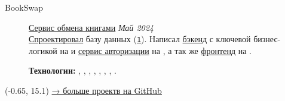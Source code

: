 \documentclass[margin,line]{resume}
\begin{document}
\begin{resume}
\begin{description}
      \item[BookSwap]\small{\href{https://github.com/alchemmist/bookswap}{Сервис
          обмена книгами} \hfill
        \textsl{Май 2024\vspace{1mm}}}\\
        \href{https://github.com/alchemmist/bookswap/blob/dev/docs/database.md}{Спроектировал}
        базу данных
        (\href{https://github.com/alchemmist/bookswap/blob/dev/backend/src/main/resources/schema.sql}{\texttt{1}}).
        Написал
        \href{https://github.com/alchemmist/bookswap/tree/dev/backend}{бэкенд}
        с ключевой бизнес-логикой на  и
        \href{https://github.com/alchemmist/bookswap/tree/dev/auth-service}{сервис
        авторизации} на , а так же
        \href{https://github.com/alchemmist/bookswap/tree/dev/frontend}{фронтенд}
        на
        .

        \textbf{Технологии:} ,
        , ,
        , , ,
        , .

    \end{description}
  \end{resume}

  \begin{minipage}[H]{9.18\textwidth}
    \begin{textblock}{7}(-0.65, 15.1)
      \begingroup
      \hspace{35mm}
      \hypersetup{urlcolor=gray!90}
      \large
      \href{https://github.com/alchemmist}{→ больше проектв на
      \underline{GitHub}}
      \endgroup
    \end{textblock}

  \end{minipage}

  \clearpage

  
\end{document}
